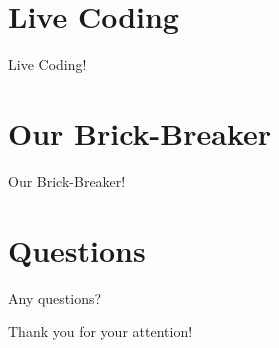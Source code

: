 \documentclass{beamer}
\begin{document}
\section{Live Coding}
\begin{frame}
\Huge{\centerline{Live Coding!}}
\end{frame}

\section{Our Brick-Breaker}
\begin{frame}
\Huge{\centerline{Our Brick-Breaker!}}
\end{frame}

\section{Questions}
\begin{frame}
\Huge{\centerline{Any questions?}}
\end{frame}

\begin{frame}
\Huge{\centerline{Thank you for your attention!}}
\end{frame}

\end{document}
